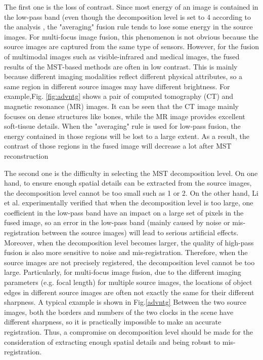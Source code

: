 The first one is the loss of contrast. Since most energy of an
image is contained in the low-pass band (even though the decomposition level is set to 4 according to the analysis , the "averaging" fusion rule tends to lose some energy in the source images. For multi-focus image fusion, this phenomenon is not obvious because the source images are captured from the same type of sensors. However, for the fusion of multimodal images such as visible-infrared and medical images, the fused results of the MST-based methods are often in low contrast. This is mainly because different imaging modalities reflect different physical attributes, so a same region in different source images may have different brightness. For example,Fig. \ref{fig:advntg} shows a pair of computed tomography (CT) and magnetic resonance (MR) images. It can be seen that the CT image mainly focuses on dense structures like bones, while the MR image provides excellent soft-tissue details. When the "averaging" rule is used for low-pass fusion, the energy contained in those regions will be lost to a large extent.
As a result, the contrast of those regions in the fused image will decrease a lot after MST reconstruction \hfill \break

The second one is the difficulty in selecting the MST decomposition level. On one hand, to ensure enough spatial details can be extracted from the source images, the decomposition level cannot be too small such as 1 or 2. On the other hand, Li et al.\cite{25} experimentally verified that when the decomposition level is too large, one coefficient in the low-pass band have an impact on a large set of pixels in the fused image, so an error in the low-pass band (mainly caused by noise or mis-registration between the source images) will lead to serious artificial effects. Moreover, when the decomposition level becomes larger, the quality of high-pass fusion is also more sensitive to noise and mis-registration. Therefore, when the source images are not precisely registered, the decomposition level cannot be too large. Particularly, for multi-focus image fusion, due to the different imaging parameters (e.g. focal length) for multiple source images, the locations of object edges in different
source images are often not exactly the same for their different sharpness. A typical example is shown in Fig.\ref{advntg} Between the two source images, both the borders and numbers of the two clocks in the scene have different sharpness, so it is practically impossible to make an accurate registration. Thus, a compromise on decomposition level should be made for the consideration of extracting enough spatial details and being robust to mis-registration.\hfill \break

